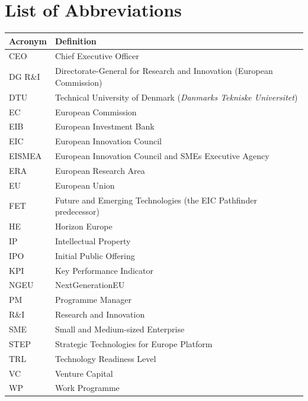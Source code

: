 \chapter*{List of Abbreviations}
\thispagestyle{plain}

\begin{tabularx}{\textwidth}{@{} l X @{}}
\toprule
\textbf{Acronym} & \textbf{Definition} \\
\midrule
CEO        & Chief Executive Officer \\
DG R\&I    & Directorate-General for Research and Innovation (European Commission) \\
DTU        & Technical University of Denmark (\textit{Danmarks Tekniske Universitet}) \\
EC         & European Commission \\
EIB        & European Investment Bank \\
EIC        & European Innovation Council \\
EISMEA     & European Innovation Council and SMEs Executive Agency \\
ERA        & European Research Area \\
EU         & European Union \\
FET        & Future and Emerging Technologies (the EIC Pathfinder predecessor) \\
HE         & Horizon Europe \\
IP         & Intellectual Property \\
IPO        & Initial Public Offering \\
KPI        & Key Performance Indicator \\
NGEU       & NextGenerationEU \\
PM         & Programme Manager \\
R\&I       & Research and Innovation \\
SME        & Small and Medium-sized Enterprise \\
STEP       & Strategic Technologies for Europe Platform \\
TRL        & Technology Readiness Level \\
VC         & Venture Capital \\
WP         & Work Programme \\
\bottomrule
\end{tabularx}

